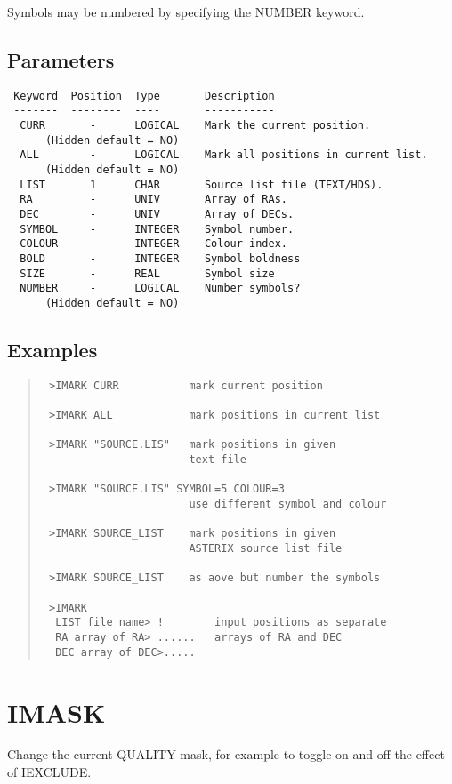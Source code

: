 \documentclass{book}
\renewcommand{\_}{{\tt\char'137}}     %
\begin{document}
Symbols may be numbered by specifying the NUMBER keyword.

\subsection{Parameters}
\begin{verbatim}
 Keyword  Position  Type       Description
 -------  --------  ----       -----------
  CURR       -      LOGICAL    Mark the current position.
      (Hidden default = NO)
  ALL        -      LOGICAL    Mark all positions in current list.
      (Hidden default = NO)
  LIST       1      CHAR       Source list file (TEXT/HDS).
  RA         -      UNIV       Array of RAs.
  DEC        -      UNIV       Array of DECs.
  SYMBOL     -      INTEGER    Symbol number.
  COLOUR     -      INTEGER    Colour index.
  BOLD       -      INTEGER    Symbol boldness
  SIZE       -      REAL       Symbol size
  NUMBER     -      LOGICAL    Number symbols?
      (Hidden default = NO)
\end{verbatim}\subsection{Examples}
\begin{quote}\begin{verbatim}
 >IMARK CURR           mark current position

 >IMARK ALL            mark positions in current list

 >IMARK "SOURCE.LIS"   mark positions in given
                       text file

 >IMARK "SOURCE.LIS" SYMBOL=5 COLOUR=3
                       use different symbol and colour

 >IMARK SOURCE_LIST    mark positions in given
                       ASTERIX source list file

 >IMARK SOURCE_LIST    as aove but number the symbols

 >IMARK
  LIST file name> !        input positions as separate
  RA array of RA> ......   arrays of RA and DEC
  DEC array of DEC>.....
 \end{verbatim}\end{quote}
\section{IMASK}
Change the current QUALITY mask, for example to toggle on
and off the effect of IEXCLUDE.
\end{document}
